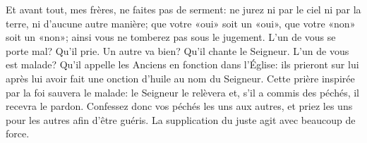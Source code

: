 Et avant tout, mes frères, ne faites pas de serment:
	ne jurez ni par le ciel ni par la terre, ni d’aucune autre manière;
	que votre «oui» soit un «oui», que votre «non» soit un «non»;
	ainsi vous ne tomberez pas sous le jugement.
L’un de vous se porte mal? Qu’il prie.
	Un autre va bien? Qu’il chante le Seigneur.
L’un de vous est malade?
	Qu’il appelle les Anciens en fonction dans l’Église:
	ils prieront sur lui après lui avoir fait une onction d’huile au nom du Seigneur.
Cette prière inspirée par la foi sauvera le malade:
	le Seigneur le relèvera
	et, s’il a commis des péchés, il recevra le pardon.
Confessez donc vos péchés les uns aux autres,
	et priez les uns pour les autres afin d’être guéris.
	La supplication du juste agit avec beaucoup de force.

